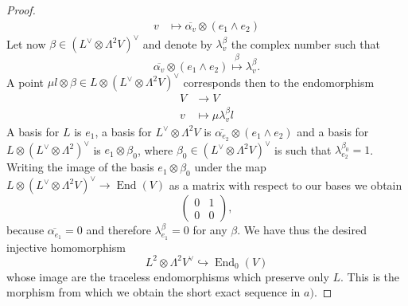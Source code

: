 \documentclass[A4paper, 12pt, british, reqno]{amsart}
\DeclareMathOperator{\End}{End}
\newcommand{\ot}{\otimes}
\newcommand{\dual}{^{\vee}}
\newcommand{\1}{\mathbbm{1}}
\begin{document}
{\begin{lm}
\begin{proof}
\begin{align*}
	    v &\longmapsto \overline{\alpha_{v}}\ot (e_{1}\wedge e_{2})
	\end{align*}
	Let now $\beta\in (L\dual \ot \Lambda^{2}V)\dual$ and denote by $\lambda_{v}^{\beta}$ the complex number such that
	\[ \overline{\alpha_{v}}\ot (e_{1}\wedge e_{2})\overset{\beta}{\longmapsto} \lambda_{v}^{\beta}. \]
	A point $\mu l\ot \beta\in L\ot (L\dual\ot \Lambda^{2}V)\dual$ corresponds then to the endomorphism
	\begin{align*}
	    V &\longrightarrow V \\
	    v &\longmapsto \mu \lambda_{v}^{\beta}l
	\end{align*}
	A basis for $L$ is $e_{1}$, a basis for $L\dual \ot \Lambda^{2}V$ is $\overline{\alpha_{e_{2}}}\ot (e_{1}\wedge e_{2})$ and a basis for $L\ot (L\dual\ot \Lambda^{2})\dual$ is $e_{1}\ot \beta_{0}$, where $\beta_{0}\in (L\dual \ot \Lambda^{2}V)\dual$ is such that $\lambda_{e_{2}}^{\beta_{0}}=1$.
	Writing the image of the basis $e_{1}\ot \beta_{0}$ under the map $L\ot (L\dual\ot \Lambda^{2}V)\dual\to \End(V)$ as a matrix with respect to our bases we obtain
	\[
	    \begin{pmatrix}
		0 & 1 \\
		0 & 0
	    \end{pmatrix},
	\]
	because $\overline{\alpha_{e_{1}}}=0$ and therefore $\lambda_{e_{1}}^{\beta}=0$ for any $\beta$.
	We have thus the desired injective homomorphism
	\[ L^{2}\ot \Lambda^{2}V\dual\hookrightarrow \End_{0}(V) \]
	whose image are the traceless endomorphisms which preserve only $L$.
	This is the morphism from which we obtain the short exact sequence in $a)$.


\end{proof}
\end{lm}}
\end{document}
